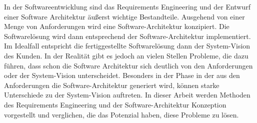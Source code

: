 In der Softwareentwicklung sind das Requirements Engineering und der Entwurf einer Software Architektur äußerst wichtige Bestandteile. Ausgehend von einer Menge von Anforderungen wird eine Software-Architektur konzipiert. Die Softwarelösung wird dann entsprechend der Software-Architektur implementiert. Im Idealfall entspricht die fertiggestellte Softwarelösung dann der System-Vision des Kunden. In der Realität gibt es jedoch an vielen Stellen Probleme, die dazu führen, dass schon die Software Architektur sich deutlich von den Anforderungen oder der System-Vision unterscheidet. Besonders in der Phase in der aus den Anforderungen die Software-Architektur generiert wird, können starke Unterschiede zu der System-Vision auftreten. In dieser Arbeit werden Methoden des Requirements Engineering und der Software-Architektur Konzeption vorgestellt und verglichen, die das Potenzial haben, diese Probleme zu lösen.